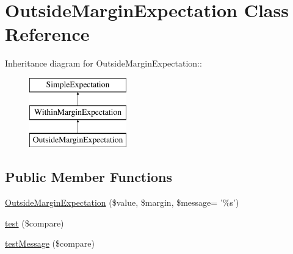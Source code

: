 \hypertarget{class_outside_margin_expectation}{
\section{OutsideMarginExpectation Class Reference}
\label{class_outside_margin_expectation}
}
Inheritance diagram for OutsideMarginExpectation::\begin{figure}[H]
\begin{center}
\leavevmode
\includegraphics[height=3cm]{class_outside_margin_expectation}
\end{center}
\end{figure}
\subsection*{Public Member Functions}
\begin{DoxyCompactItemize}
\item 
\hyperlink{class_outside_margin_expectation_a1413a72a816e6d5b0bbcc0895cbe6f12}{OutsideMarginExpectation} (\$value, \$margin, \$message= '\%s')
\item 
\hyperlink{class_outside_margin_expectation_a6c68e08230af88b7cf33445bbc2ff24f}{test} (\$compare)
\item 
\hyperlink{class_outside_margin_expectation_a62179c3675f6db8e4e41d7fffc32acfd}{testMessage} (\$compare)
\end{DoxyCompactItemize}


